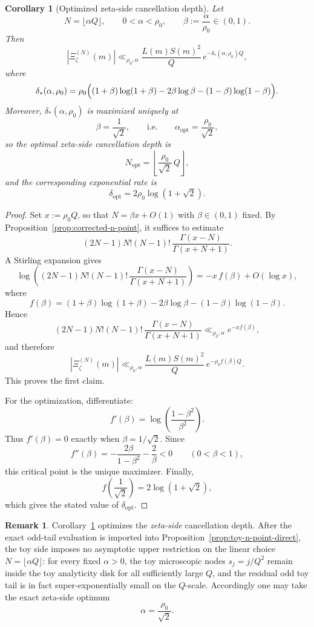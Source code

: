 \documentclass[11pt,a4paper]{amsart}
\theoremstyle{plain}
\newtheorem{corollary}[theorem]{Corollary}
\theoremstyle{definition}
\newtheorem{remark}[theorem]{Remark}
\begin{document}
\begin{corollary}[Optimized zeta-side cancellation depth]
\label{cor:optimized-zeta-cancellation-depth}
Let
\[
N=\lfloor \alpha Q\rfloor,
\qquad
0<\alpha<\rho_0,
\qquad
\beta:=\frac{\alpha}{\rho_0}\in(0,1).
\]
Then
\[
|\Xi_\zeta^{(N)}(m)|
\ll_{\rho_0,\alpha}
\frac{L(m)S(m)^2}{Q}\,
e^{-\delta_*(\alpha,\rho_0)Q},
\]
where
\[
\delta_*(\alpha,\rho_0)
=
\rho_0\Bigl(
(1+\beta)\log(1+\beta)
-2\beta\log\beta
-(1-\beta)\log(1-\beta)
\Bigr).
\]
Moreover, $\delta_*(\alpha,\rho_0)$ is maximized uniquely at
\[
\beta=\frac{1}{\sqrt2},
\qquad\text{i.e.}\qquad
\alpha_{\mathrm{opt}}=\frac{\rho_0}{\sqrt2},
\]
so the optimal zeta-side cancellation depth is
\[
N_{\mathrm{opt}}
=
\left\lfloor \frac{\rho_0}{\sqrt2}\,Q\right\rfloor,
\]
and the corresponding exponential rate is
\[
\delta_{\mathrm{opt}}
=
2\rho_0\log(1+\sqrt2).
\]
\end{corollary}

\begin{proof}
Set $x:=\rho_0Q$, so that $N=\beta x+O(1)$ with $\beta\in(0,1)$ fixed.
By Proposition~\ref{prop:corrected-n-point}, it suffices to estimate
\[
(2N-1)N!(N-1)!\,\frac{\Gamma(x-N)}{\Gamma(x+N+1)}.
\]
A Stirling expansion gives
\[
\log\!\left(
(2N-1)N!(N-1)!\,\frac{\Gamma(x-N)}{\Gamma(x+N+1)}
\right)
=
-x\,f(\beta)+O(\log x),
\]
where
\[
f(\beta)
=
(1+\beta)\log(1+\beta)
-2\beta\log\beta
-(1-\beta)\log(1-\beta).
\]
Hence
\[
(2N-1)N!(N-1)!\,\frac{\Gamma(x-N)}{\Gamma(x+N+1)}
\ll_{\rho_0,\alpha}
e^{-x f(\beta)},
\]
and therefore
\[
|\Xi_\zeta^{(N)}(m)|
\ll_{\rho_0,\alpha}
\frac{L(m)S(m)^2}{Q}\,
e^{-\rho_0 f(\beta)Q}.
\]
This proves the first claim.

For the optimization, differentiate:
\[
f'(\beta)
=
\log\!\left(\frac{1-\beta^2}{\beta^2}\right).
\]
Thus $f'(\beta)=0$ exactly when $\beta=1/\sqrt2$. Since
\[
f''(\beta)
=
-\frac{2\beta}{1-\beta^2}-\frac{2}{\beta}<0
\qquad (0<\beta<1),
\]
this critical point is the unique maximizer. Finally,
\[
f\!\left(\frac{1}{\sqrt2}\right)
=
2\log(1+\sqrt2),
\]
which gives the stated value of $\delta_{\mathrm{opt}}$.
\end{proof}

\begin{remark}
Corollary~\ref{cor:optimized-zeta-cancellation-depth} optimizes the
\emph{zeta-side} cancellation depth. After the exact odd-tail evaluation is
imported into Proposition~\ref{prop:toy-n-point-direct}, the toy side imposes
no asymptotic upper restriction on the linear choice $N=\lfloor \alpha
Q\rfloor$: for every fixed $\alpha>0$, the toy microscopic nodes
$s_j=j/Q^2$ remain inside the toy analyticity disk for all sufficiently
large $Q$, and the residual odd toy tail is in fact super-exponentially
small on the $Q$-scale. Accordingly one may take the exact zeta-side
optimum
\[
\alpha=\frac{\rho_0}{\sqrt2}.
\]
\end{remark}
\end{document}
